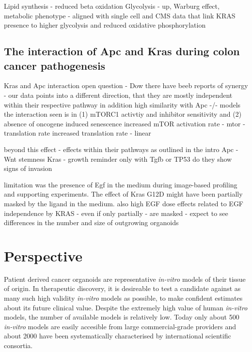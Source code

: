 \begin{flushleft}
Lipid synthesis - reduced beta oxidation
Glycolysis - up, Warburg effect, metabolic phenotype - aligned with single cell and CMS data that link KRAS presence to higher glycolysis and reduced oxidative phosphorylation 


\subsection{The interaction of Apc and Kras during colon cancer pathogenesis}
Kras and Apc interaction open question - Dow
there have beeb reports of synergy \citep{luoMutatedRasAsp122009} - our data points into a different direction, that they are mostly independent within their respective pathway 
in addition high similarity with Apc -/- models
the interaction seen is in (1) mTORC1 activtiy and inhibitor sensitivity and (2) absence of oncogene induced senescence 
increased mTOR activation rate - mtor - translation rate
increased translation rate \citep{smitDriverMutationsAdenomacarcinoma2020a} - linear

beyond this effect - effects within their pathways
as outlined in the intro 
Apc - Wnt stemness 
Kras - growth
reminder only with Tgfb or TP53 do they show signs of invasion
\par

limitation was the presence of Egf in the medium during image-based profiling and supporting experiments. The effect of Kras G12D might have been partially masked by the ligand in the medium. 
also high EGF dose
effects related to EGF independence by KRAS - even if only partially - are masked - 
expect to see differences in the number and size of outgrowing organoids


\section{Perspective}

Patient derived cancer organoids are representative \textit{in-vitro} models of their tissue of origin. In therapeutic discovery, it is desireable to test a candidate against as many such high validity \textit{in-vitro} models as possible, to make confident estimates about its future clinical value. Despite the extremely high value of human \textit{in-vitro} models, the number of available models is relatively low. Today only about 500 \textit{in-vitro} models are easily accesible from large commercial-grade providers and about 2000 have been systematically characterised by international scientific consortia. 


\end{flushleft}
